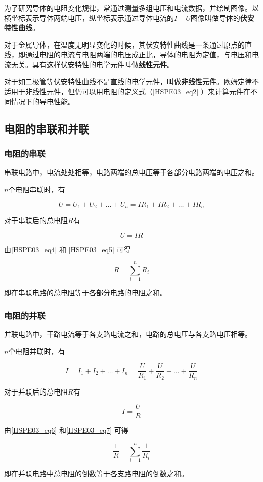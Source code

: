 为了研究导体的电阻变化规律，常通过测量多组电压和电流数据，并绘制图像。以横坐标表示导体两端电压，纵坐标表示通过导体电流的$I-U$图像叫做导体的\textbf{伏安特性曲线}。

对于金属导体，在温度无明显变化的时候，其伏安特性曲线是一条通过原点的直线，即通过电阻的电流与电阻两端的电压成正比，导体的电阻为定值，与电压和电流无关。具有这样伏安特性的电学元件叫做\textbf{线性元件}。

对于如二极管等伏安特性曲线不是直线的电学元件，叫做\textbf{非线性元件}。欧姆定律不适用于非线性元件，但仍可以用电阻的定义式（\autoref{HSPE03_eq2} ）来计算元件在不同情况下的导电性能。

\subsection{电阻的串联和并联}

\subsubsection{电阻的串联}

串联电路中，电流处处相等，电路两端的总电压等于各部分电路两端的电压之和。

$n$个电阻串联时，有

\begin{equation}\label{HSPE03_eq4}
U=U_1+U_2+\dots +U_n=IR_1+IR_2+\dots +IR_n
\end{equation}

对于串联后的总电阻$R$有

\begin{equation}\label{HSPE03_eq5}
U=IR
\end{equation}

由\autoref{HSPE03_eq4} 和 \autoref{HSPE03_eq5} 可得

\begin{equation}
R=\sum_{i=1}^{n}R_i
\end{equation}

即在串联电路的总电阻等于各部分电路的电阻之和。

\subsubsection{电阻的并联}

并联电路中，干路电流等于各支路电流之和，电路的总电压与各支路电压相等。

$n$个电阻并联时，有

\begin{equation}\label{HSPE03_eq6}
I=I_1+I_2+\dots +I_n=\frac{U}{R_1}+\frac{U}{R_2}+\dots +\frac{U}{R_n}
\end{equation}

对于并联后的总电阻$R$有

\begin{equation}\label{HSPE03_eq7}
I=\frac{U}{R}
\end{equation}

由\autoref{HSPE03_eq6} 和\autoref{HSPE03_eq7} 可得

\begin{equation}
\frac{1}{R}=\sum_{i=1}^{n}\frac{1}{R_i}
\end{equation}

即在并联电路中总电阻的倒数等于各支路电阻的倒数之和。
